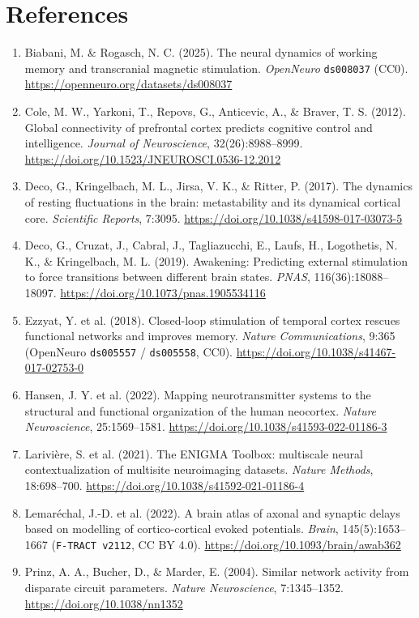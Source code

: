\documentclass[11pt,a4paper]{article}
\begin{document}
\section*{References}
\begin{enumerate}
\item Biabani, M. \& Rogasch, N. C. (2025). The neural dynamics of working memory and transcranial magnetic stimulation. \emph{OpenNeuro} \texttt{ds008037} (CC0). \url{https://openneuro.org/datasets/ds008037}
\item Cole, M. W., Yarkoni, T., Repovs, G., Anticevic, A., \& Braver, T. S. (2012). Global connectivity of prefrontal cortex predicts cognitive control and intelligence. \emph{Journal of Neuroscience}, 32(26):8988--8999. \url{https://doi.org/10.1523/JNEUROSCI.0536-12.2012}
\item Deco, G., Kringelbach, M. L., Jirsa, V. K., \& Ritter, P. (2017). The dynamics of resting fluctuations in the brain: metastability and its dynamical cortical core. \emph{Scientific Reports}, 7:3095. \url{https://doi.org/10.1038/s41598-017-03073-5}
\item Deco, G., Cruzat, J., Cabral, J., Tagliazucchi, E., Laufs, H., Logothetis, N. K., \& Kringelbach, M. L. (2019). Awakening: Predicting external stimulation to force transitions between different brain states. \emph{PNAS}, 116(36):18088--18097. \url{https://doi.org/10.1073/pnas.1905534116}
\item Ezzyat, Y. et al. (2018). Closed-loop stimulation of temporal cortex rescues functional networks and improves memory. \emph{Nature Communications}, 9:365 (OpenNeuro \texttt{ds005557} / \texttt{ds005558}, CC0). \url{https://doi.org/10.1038/s41467-017-02753-0}
\item Hansen, J. Y. et al. (2022). Mapping neurotransmitter systems to the structural and functional organization of the human neocortex. \emph{Nature Neuroscience}, 25:1569--1581. \url{https://doi.org/10.1038/s41593-022-01186-3}
\item Larivière, S. et al. (2021). The ENIGMA Toolbox: multiscale neural contextualization of multisite neuroimaging datasets. \emph{Nature Methods}, 18:698--700. \url{https://doi.org/10.1038/s41592-021-01186-4}
\item Lemaréchal, J.-D. et al. (2022). A brain atlas of axonal and synaptic delays based on modelling of cortico-cortical evoked potentials. \emph{Brain}, 145(5):1653--1667 (\texttt{F-TRACT v2112}, CC BY 4.0). \url{https://doi.org/10.1093/brain/awab362}
\item Prinz, A. A., Bucher, D., \& Marder, E. (2004). Similar network activity from disparate circuit parameters. \emph{Nature Neuroscience}, 7:1345--1352. \url{https://doi.org/10.1038/nn1352}

\end{enumerate}
\end{document}
